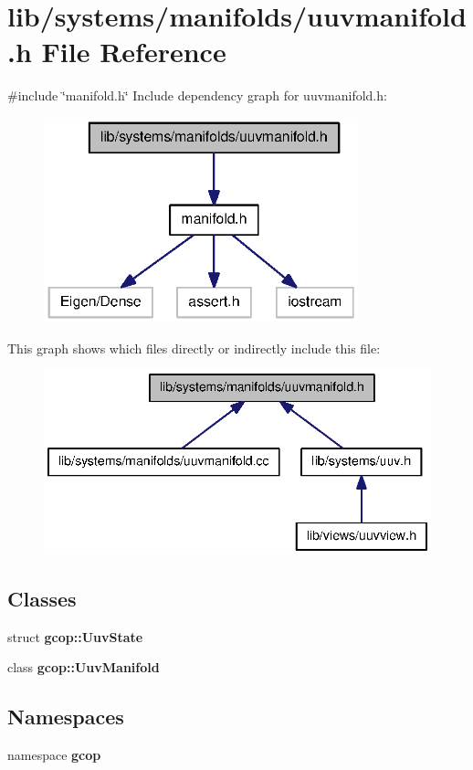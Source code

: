 \section{lib/systems/manifolds/uuvmanifold.h \-File \-Reference}
\label{uuvmanifold_8h}
{\ttfamily \#include \char`\"{}manifold.\-h\char`\"{}}\*
\-Include dependency graph for uuvmanifold.\-h\-:\nopagebreak
\begin{figure}[H]
\begin{center}
\leavevmode
\includegraphics[width=258pt]{uuvmanifold_8h__incl}
\end{center}
\end{figure}
\-This graph shows which files directly or indirectly include this file\-:\nopagebreak
\begin{figure}[H]
\begin{center}
\leavevmode
\includegraphics[width=340pt]{uuvmanifold_8h__dep__incl}
\end{center}
\end{figure}
\subsection*{\-Classes}
\begin{DoxyCompactItemize}
\item 
struct {\bf gcop\-::\-Uuv\-State}
\item 
class {\bf gcop\-::\-Uuv\-Manifold}
\end{DoxyCompactItemize}
\subsection*{\-Namespaces}
\begin{DoxyCompactItemize}
\item 
namespace {\bf gcop}
\end{DoxyCompactItemize}
